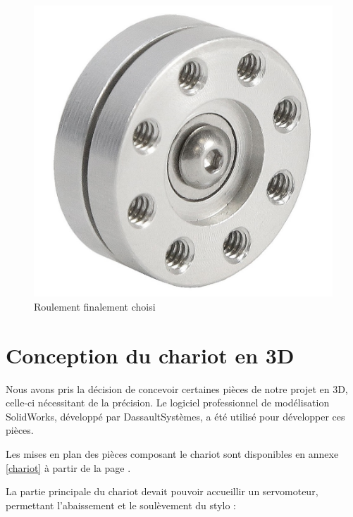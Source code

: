 \documentclass[12pt,a4paper]{report}
\begin{document}
	\begin{figure}[!h]
 \center
 \includegraphics[scale=0.15]{../pictures/swivelhub}
 \caption{Roulement finalement choisi}
\end{figure}

	
	
	\section{Conception du chariot en 3D}
	
	Nous avons pris la décision de concevoir certaines pièces de notre projet en 3D, celle-ci nécessitant de la précision. Le logiciel professionnel de modélisation SolidWorks, développé par DassaultSystèmes, a été utilisé pour développer ces pièces.
	
	Les mises en plan des pièces composant le chariot sont disponibles en annexe \ref{chariot} à partir de la page \pageref{chariot}.
	
	La partie principale du chariot devait pouvoir accueillir un servomoteur, permettant l'abaissement et le soulèvement du stylo :
	
	
\end{document}
